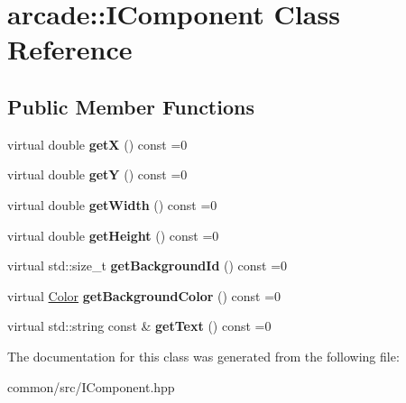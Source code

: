\hypertarget{classarcade_1_1IComponent}{}\section{arcade\+:\+:I\+Component Class Reference}
\label{classarcade_1_1IComponent}
\subsection*{Public Member Functions}
\begin{DoxyCompactItemize}
\item 
\mbox{\label{classarcade_1_1IComponent_a61139bbc8ad6a1daa4f69cc4a604eb8c}} 
virtual double {\bfseries getX} () const =0
\item 
\mbox{\label{classarcade_1_1IComponent_a6570fa654dcb61447fece948dfa3e69a}} 
virtual double {\bfseries getY} () const =0
\item 
\mbox{\label{classarcade_1_1IComponent_a558e5d49736a3828753a4062d5c9bfb1}} 
virtual double {\bfseries get\+Width} () const =0
\item 
\mbox{\label{classarcade_1_1IComponent_ae1a09a263120185899304b1cbf437116}} 
virtual double {\bfseries get\+Height} () const =0
\item 
\mbox{\label{classarcade_1_1IComponent_a8c44c42832800ea30ff2bd34bd0ed140}} 
virtual std\+::size\+\_\+t {\bfseries get\+Background\+Id} () const =0
\item 
\mbox{\label{classarcade_1_1IComponent_a8c91e73c0efb5047faf810ea4eb1bf33}} 
virtual \hyperlink{unionarcade_1_1Color}{Color} {\bfseries get\+Background\+Color} () const =0
\item 
\mbox{\label{classarcade_1_1IComponent_a67df76de7dbc935e5a61bc4e1abc60de}} 
virtual std\+::string const  \& {\bfseries get\+Text} () const =0
\end{DoxyCompactItemize}


The documentation for this class was generated from the following file\+:\begin{DoxyCompactItemize}
\item 
common/src/I\+Component.\+hpp\end{DoxyCompactItemize}
